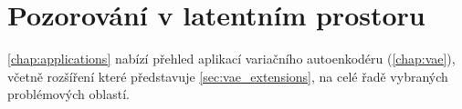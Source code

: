 \section{Pozorování v latentním prostoru}
\autoref{chap:applications} nabízí přehled aplikací variačního autoenkodéru (\autoref{chap:vae}), včetně rozšíření které představuje \autoref{sec:vae_extensions}, na celé řadě vybraných problémových oblastí.